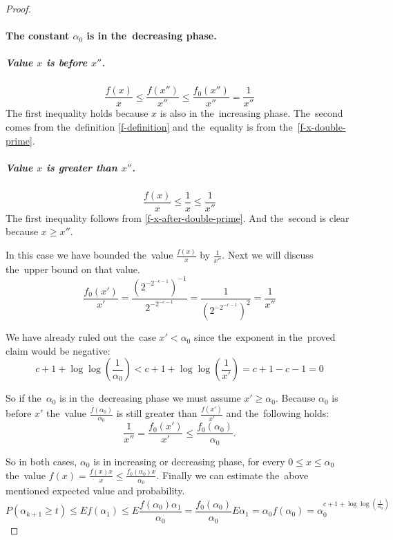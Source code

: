 \begin{proof}
\paragraph*{The constant $\alpha_0$ is in the~decreasing phase.}
\subparagraph*{Value $x$ is before $x''$.}
\begin{equation}
\frac{f(x)}{x} \leq \frac{f(x'')}{x''} \leq \frac{f_0(x'')}{x''} = \frac{1}{x''}
\end{equation}
The first inequality holds because $x$ is also in the~increasing phase. The~second comes from the~definition \eqref{f-definition} and the~equality is from the~\eqref{f-x-double-prime}.

\subparagraph*{Value $x$ is greater than $x''$.}
\begin{equation}
\frac{f(x)}{x} \leq \frac{1}{x} \leq \frac{1}{x''}
\end{equation}
The first inequality follows from \eqref{f-x-after-double-prime}. And the~second is clear because $x \geq x''$.

In this case we have bounded the~value $\frac{f(x)}{x}$ by $\frac{1}{x''}$. Next we will discuss the~upper bound on that value.
\begin{equation}
\frac{f_0(x')}{x'} = \frac{\left({2 ^ {-2 ^ {-c - 1}}}\right)^{-1}}{2 ^ {-2 ^ {-c - 1}}} = \frac{1}{\left({2 ^ {-2 ^ {-c - 1}}}\right)^2} = \frac{1}{x''}
\end{equation}

We have already ruled out the~case $x' < \alpha_0$ since the~exponent in the~proved claim would be negative:
\begin{displaymath}
c + 1 + \log \log \left(\frac{1}{\alpha_0}\right) < c + 1 + \log \log \left(\frac{1}{x'}\right) = c + 1 - c - 1 = 0
\end{displaymath}

So if the~$\alpha_0$ is in the~decreasing phase we must assume $x' \geq \alpha_0$. Because $\alpha_0$ is before $x'$ the~value $\frac{f(\alpha_0)}{\alpha_0}$ is still greater than $\frac{f(x')}{x'}$ and the~following holds:
\begin{displaymath}
\frac{1}{x''} = \frac{f_0(x')}{x'} \leq \frac{{f_0}(\alpha_0)}{\alpha_0}\textit{.}
\end{displaymath}

So in both cases, $\alpha_0$ is in increasing or decreasing phase, for every $0 \leq x \leq \alpha_0$ the~value $f(x) = \frac{f(x)x}{x} \leq \frac{f_0(\alpha_0)x}{\alpha_0}$. Finally we can estimate the~above mentioned expected value and probability.
\begin{displaymath}
P(\alpha_{k+1} \geq t) \leq E f(\alpha_1) \leq E \frac{f(\alpha_0)\alpha_1}{\alpha_0} = \frac{f_0(\alpha_0)}{\alpha_0}E \alpha_1 = \alpha_0 f(\alpha_0) = \alpha_0^{c + 1 + \log \log \left(\frac{1}{\alpha_0}\right)}
\end{displaymath}

\end{proof}

